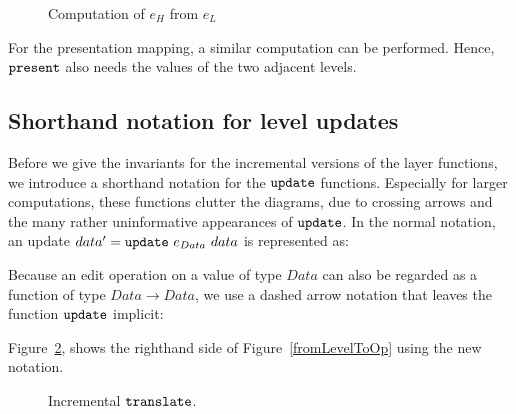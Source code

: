 \begin{figure}
\begin{small}
\begin{center}
\begin{center}
\end{center}\caption{Computation of $e_{H}$ from $e_{L}$}\label{computeOps} 
\end{center}
\end{small}
\end{figure}

For the presentation mapping, a similar computation can be performed. Hence, ${\tt present}$ also needs the values of the two adjacent levels. 


%																
\subsection{Shorthand notation for level updates}

Before we give the invariants for the incremental versions of the layer functions, we introduce a shorthand notation for the ${\tt update}$ functions. Especially for larger computations, these functions clutter the diagrams, due to crossing arrows and the many rather uninformative appearances of ${\tt update}$. In the normal notation, an update $data' = {\tt update}~e_{Data}~data$ is represented as:\\


\smallskip
Because an edit operation on a value of type $Data$ can also be regarded as a function of type 
$Data \rightarrow Data$, we use a dashed arrow notation that leaves the function ${\tt update}$ implicit:\\


Figure~\ref{incrementalTranslate}, shows the righthand side of Figure~\ref{fromLevelToOp} using the new notation.

\begin{figure}
\begin{small}
\begin{center}
\begin{center}
\end{center}\caption{Incremental ${\tt translate}$.}\label{incrementalTranslate} 
\end{center}
\end{small}
\end{figure}


